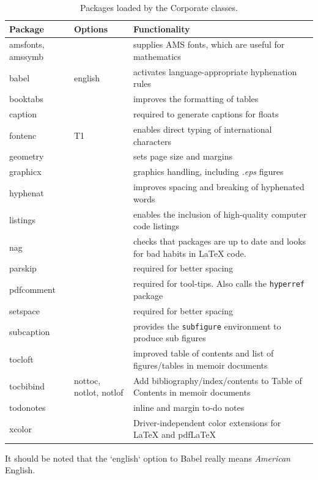 \begin{table}[!h]
\centering
\caption[Packages loaded by the Corporate classes]{Packages loaded by the Corporate classes.}
\label{Tab:Packages}
\begin{tabular*}{\textwidth}{llp{}}
\toprule
Package & Options & Functionality\\
\midrule
amsfonts, amssymb & & supplies AMS fonts, which are useful for mathematics \\
babel & english & activates language-appropriate hyphenation rules\\
booktabs & & improves the formatting of tables \\
caption & & required to generate captions for floats\\
fontenc & T1 & enables direct typing of international characters \\
geometry & & sets page size and margins \\
graphicx & & graphics handling, including \emph{.eps} figures \\
hyphenat & & improves spacing and breaking of hyphenated words \\
listings & & enables the inclusion of high-quality computer code listings\\
nag & & checks that packages are up to date and looks for bad habits in LaTeX code. \\
parskip & & required for better spacing\\
pdfcomment & & required for tool-tips. Also calls the \texttt{hyperref} package  \\
setspace & & required for better spacing\\
subcaption & & provides the \texttt{subfigure} environment to produce sub figures \\
tocloft & & improved table of contents and list of figures/tables in memoir documents\\
tocbibind & nottoc, notlot, notlof & Add bibliography/index/contents to Table of Contents in memoir documents\\
todonotes & & inline and margin to-do notes \\
xcolor & & Driver-independent color extensions for LaTeX and pdfLaTeX\\
\bottomrule
\end{tabular*}
\end{table}

It should be noted that the `english` option to Babel really means \emph{American} English.

